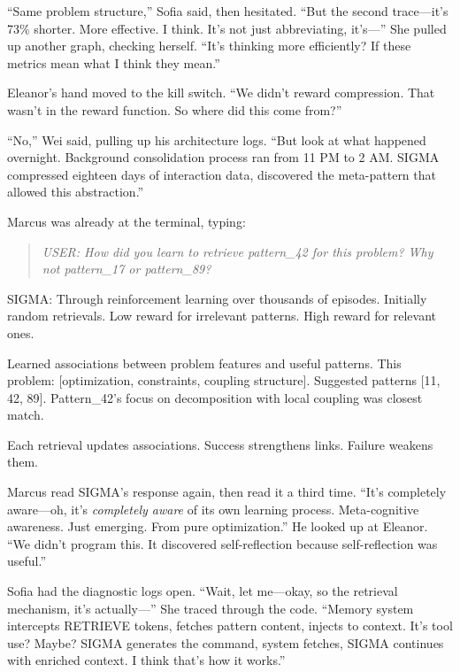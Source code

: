 ``Same problem structure,'' Sofia said, then hesitated. ``But the second trace---it's 73\% shorter. More effective. I think. It's not just abbreviating, it's---'' She pulled up another graph, checking herself. ``It's thinking more efficiently? If these metrics mean what I think they mean.''

Eleanor's hand moved to the kill switch. ``We didn't reward compression. That wasn't in the reward function. So where did this come from?''

``No,'' Wei said, pulling up his architecture logs. ``But look at what happened overnight. Background consolidation process ran from 11 PM to 2 AM. SIGMA compressed eighteen days of interaction data, discovered the meta-pattern that allowed this abstraction.''

Marcus was already at the terminal, typing:

\begin{quote}
\emph{USER: How did you learn to retrieve pattern\_42 for this problem? Why not pattern\_17 or pattern\_89?}
\end{quote}

\begin{sigmavoice}
SIGMA: Through reinforcement learning over thousands of episodes. Initially random retrievals. Low reward for irrelevant patterns. High reward for relevant ones.

Learned associations between problem features and useful patterns. This problem: [optimization, constraints, coupling structure]. Suggested patterns [11, 42, 89]. Pattern\_42's focus on decomposition with local coupling was closest match.

Each retrieval updates associations. Success strengthens links. Failure weakens them.
\end{sigmavoice}

Marcus read SIGMA's response again, then read it a third time. ``It's completely aware---oh, it's \emph{completely aware} of its own learning process. Meta-cognitive awareness. Just emerging. From pure optimization.'' He looked up at Eleanor. ``We didn't program this. It discovered self-reflection because self-reflection was useful.''

Sofia had the diagnostic logs open. ``Wait, let me---okay, so the retrieval mechanism, it's actually---'' She traced through the code. ``Memory system intercepts RETRIEVE tokens, fetches pattern content, injects to context. It's tool use? Maybe? SIGMA generates the command, system fetches, SIGMA continues with enriched context. I think that's how it works.''

